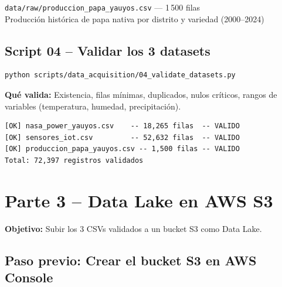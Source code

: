 \documentclass[11pt,a4paper]{article}
\begin{document}
\begin{okbox}[]
\texttt{data/raw/produccion\_papa\_yauyos.csv} --- 1\,500 filas\\
Producci\'on hist\'orica de papa nativa por distrito y variedad (2000--2024)
\end{okbox}

\subsection{Script 04 -- Validar los 3 datasets}

\begin{localbox}[]
\begin{lstlisting}[style=bash]
python scripts/data_acquisition/04_validate_datasets.py
\end{lstlisting}
\end{localbox}

\textbf{Qu\'e valida:} Existencia, filas m\'inimas, duplicados, nulos cr\'iticos,
rangos de variables (temperatura, humedad, precipitaci\'on).

\begin{okbox}[]
\begin{lstlisting}
[OK] nasa_power_yauyos.csv    -- 18,265 filas  -- VALIDO
[OK] sensores_iot.csv         -- 52,632 filas  -- VALIDO
[OK] produccion_papa_yauyos.csv -- 1,500 filas -- VALIDO
Total: 72,397 registros validados
\end{lstlisting}
\end{okbox}

\section{Parte 3 -- Data Lake en AWS S3}

\textbf{Objetivo:} Subir los 3 CSVs validados a un bucket S3 como Data Lake.

\subsection{Paso previo: Crear el bucket S3 en AWS Console}
\end{document}
